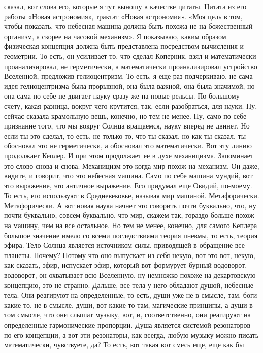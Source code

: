 сказал, вот слова его, которые я тут выношу в качестве цитаты. Цитата из его
работы «Новая астрономия», трактат «Новая астрономия». «Моя цель в том, чтобы
показать, что небесная машина должна быть похожа не на божественный организм, а
скорее на часовой механизм». Я показываю, каким образом физическая концепция
должна быть представлена посредством вычисления и геометрии. То есть, он
усиливает то, что сделал Коперник, взял и математически проанализировал, не
герметически, а математически проанализировал устройство Вселенной, предложив
гелиоцентризм. То есть, я еще раз подчеркиваю, не сама идея гелиоцентризма была
прорывной, она была важной, она была значимой, но она сама по себе не двигает
науку сразу же на новые рельсы. По большому счету, какая разница, вокруг чего
крутится, так, если разобраться, для науки. Ну, сейчас сказала крамольную вещь,
конечно, но тем не менее. Ну, само по себе признание того, что мы вокруг Солнца
вращаемся, науку вперед не двинет. Но если ты это сделал, то есть, не только то,
что ты сказал, но как ты сказал, ты обосновал это не герметически, а обосновал
это математически. Вот эту линию продолжает Кеплер. И при этом продолжает ее в
духе механицизма. Запоминает это слово снова и снова. Механицизм это когда мир
похож на механизм. Он даже, видите, и говорит, что это небесная машина. Само по
себе машина мундий, вот это выражение, это античное выражение. Его придумал еще
Овидий, по-моему. То есть, его используют в Средневековье, называя мир машиной.
Метафорически. Метафорически. А вот новая наука начнет это говорить почти
буквально, что, ну почти буквально, совсем буквально, что мир, скажем так,
гораздо больше похож на машину, чем на все остальное. Но тем не менее, конечно,
для самого Кеплера большое значение имело со всеми последствиями теория пневмы,
то есть, теория эфира. Тело Солнца является источником силы, приводящей в
обращение все планеты. Почему? Потому что оно выпускает из себя некую, вот это
вот, некую, как сказать, эфир, испускает эфир, который вот формурует бурный
водоворот, водоворот, он охватывает всю Вселенную, ну немножко похоже на
декартовскую концепцию, это не странно. Дальше, все тела у него обладают душой,
небесные тела. Они реагируют на определенные, то есть, души уже не в смысле,
там, боги какие-то, не в смысле, души, вот какие-то там, магические принципы, а
души в том смысле, что они слышат музыку, вот, и, соответственно, они реагируют
на определенные гармонические пропорции. Душа является системой резонаторов по
его концепции, а вот эти резонаторы, как всегда, любую музыку можно писать
математически, чувствуете, да? То есть, вот такая вот смесь еще, еще как бы
